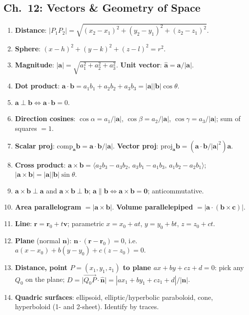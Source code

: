 \documentclass[12pt]{article}
\theoremstyle{compact}
\renewcommand{\vec}[1]{\mathbf{#1}}
\begin{document}
\subsection{Ch.\ 12: Vectors \& Geometry of Space}
\begin{enumerate}[label=\textbf{12.\arabic*.},leftmargin=*,itemsep=1pt]
  \item \textbf{Distance}: $|P_1P_2|=\sqrt{(x_2-x_1)^2+(y_2-y_1)^2+(z_2-z_1)^2}$.
  \item \textbf{Sphere}: $(x-h)^2+(y-k)^2+(z-l)^2=r^2$.
  \item \textbf{Magnitude}: $|\vec{a}|=\sqrt{a_1^2+a_2^2+a_3^2}$. \textbf{Unit vector}: $\hat{\vec{a}}=\vec{a}/|\vec{a}|$.
  \item \textbf{Dot product}: $\vec{a}\cdot\vec{b}=a_1b_1+a_2b_2+a_3b_3=|\vec{a}||\vec{b}|\cos\theta$.
  \item $\vec{a}\perp\vec{b}\iff\vec{a}\cdot\vec{b}=0$.
  \item \textbf{Direction cosines}: $\cos\alpha=a_1/|\vec{a}|$, $\cos\beta=a_2/|\vec{a}|$, $\cos\gamma=a_3/|\vec{a}|$; sum of squares $=1$.
  \item \textbf{Scalar proj}: $\mathrm{comp}_{\vec{a}}\vec{b}=\vec{a}\cdot\vec{b}/|\vec{a}|$. \textbf{Vector proj}: $\mathrm{proj}_{\vec{a}}\vec{b}=(\vec{a}\cdot\vec{b}/|\vec{a}|^2)\vec{a}$.
  \item \textbf{Cross product}: $\vec{a}\times\vec{b}=\langle a_2b_3-a_3b_2,\,a_3b_1-a_1b_3,\,a_1b_2-a_2b_1\rangle$; $|\vec{a}\times\vec{b}|=|\vec{a}||\vec{b}|\sin\theta$.
  \item $\vec{a}\times\vec{b}\perp\vec{a}$ and $\vec{a}\times\vec{b}\perp\vec{b}$; $\vec{a}\parallel\vec{b}\iff\vec{a}\times\vec{b}=\vec{0}$; anticommutative.
  \item \textbf{Area parallelogram} $=|\vec{a}\times\vec{b}|$. \textbf{Volume parallelepiped} $=|\vec{a}\cdot(\vec{b}\times\vec{c})|$.
  \item \textbf{Line}: $\vec{r}=\vec{r}_0+t\vec{v}$; parametric $x=x_0+at$, $y=y_0+bt$, $z=z_0+ct$.
  \item \textbf{Plane} (normal $\vec{n}$): $\vec{n}\cdot(\vec{r}-\vec{r}_0)=0$, i.e.\ $a(x-x_0)+b(y-y_0)+c(z-z_0)=0$.
  \item \textbf{Distance, point $P=(x_1,y_1,z_1)$ to plane $ax+by+cz+d=0$}: pick any $Q_0$ on the plane; $D=\bigl|\overrightarrow{Q_0P}\cdot\hat{\vec{n}}\bigr|=|ax_1+by_1+cz_1+d|/|\vec{n}|$.
  \item \textbf{Quadric surfaces}: ellipsoid, elliptic/hyperbolic paraboloid, cone, hyperboloid (1- and 2-sheet). Identify by traces.
\end{enumerate}
\end{document}
